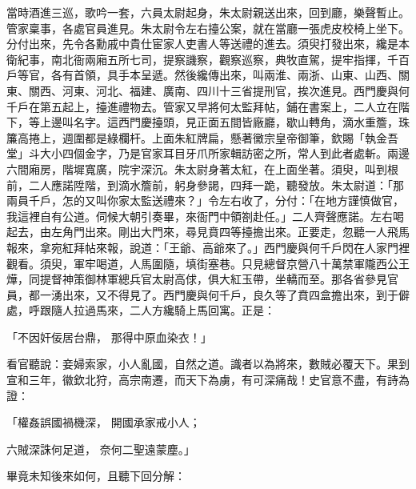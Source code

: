 當時酒進三巡，歌吟一套，六員太尉起身，朱太尉親送出來，回到廳，樂聲暫止。管家稟事，各處官員進見。朱太尉令左右擡公案，就在當廳一張虎皮校椅上坐下。分付出來，先令各勳戚中貴仕宦家人吏書人等送禮的進去。須臾打發出來，纔是本衛紀事，南北衙兩廂五所七司，提察譏察，觀察巡察，典牧直駕，提牢指揮，千百戶等官，各有首領，具手本呈遞。然後纔傳出來，叫兩淮、兩浙、山東、山西、關東、關西、河東、河北、福建、廣南、四川十三省提刑官，挨次進見。西門慶與何千戶在第五起上，擡進禮物去。管家又早將何太監拜帖，鋪在書案上，二人立在階下，等上邊叫名字。這西門慶擡頭，見正面五間皆廠廳，歇山轉角，滴水重簷，珠簾高捲上，週圍都是綠欄杆。上面朱紅牌扁，懸著黴宗皇帝御筆，欽賜「執金吾堂」斗大小四個金字，乃是官家耳目牙爪所家輯訪密之所，常人到此者處斬。兩邊六間廂房，階墀寬廣，院宇深沉。朱太尉身著太紅，在上面坐著。須臾，叫到根前，二人應諾陞階，到滴水簷前，躬身參謁，四拜一跪，聽發放。朱太尉道：「那兩員千戶，怎的又叫你家太監送禮來？」令左右收了，分付：「在地方謹慎做官，我這裡自有公道。伺候大朝引奏畢，來衙門中領劄赴任。」二人齊聲應諾。左右喝起去，由左角門出來。剛出大門來，尋見賁四等擡擔出來。正要走，忽聽一人飛馬報來，拿宛紅拜帖來報，說道：「王爺、高爺來了。」西門慶與何千戶閃在人家門裡觀看。須臾，軍牢喝道，人馬圍隨，填街塞巷。只見總督京營八十萬禁軍隴西公王燁，同提督神策御林軍總兵官太尉高俅，俱大紅玉帶，坐轎而至。那各省參見官員，都一湧出來，又不得見了。西門慶與何千戶，良久等了賁四盒擔出來，到于僻處，呼跟隨人拉過馬來，二人方纔騎上馬回寓。正是：

「不因奸佞居台鼎，  那得中原血染衣！」

看官聽說：妾婦索家，小人亂國，自然之道。識者以為將來，數賊必覆天下。果到宣和三年，徽欽北狩，高宗南遷，而天下為虜，有可深痛哉！史官意不盡，有詩為證：

「權姦誤國禍機深，  開國承家戒小人；

六賊深誅何足道，  奈何二聖遠蒙塵。」

畢竟未知後來如何，且聽下回分解：

